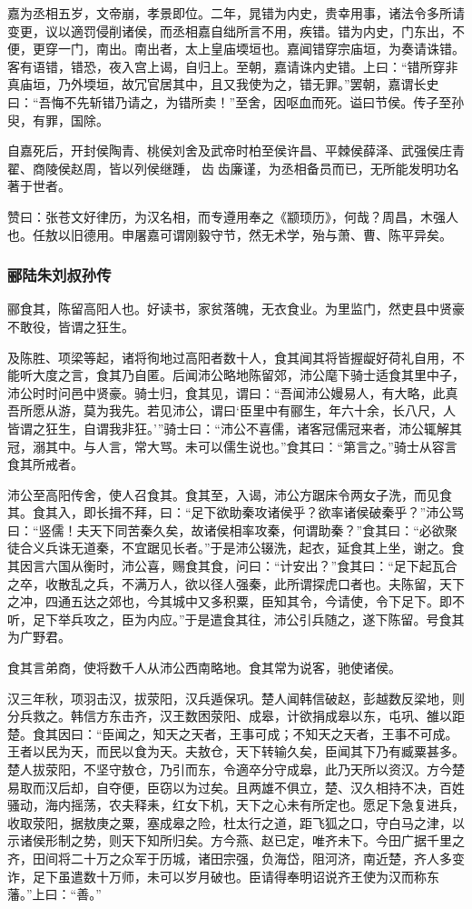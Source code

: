 \documentclass[]{article}
\begin{document}
嘉为丞相五岁，文帝崩，孝景即位。二年，晁错为内史，贵幸用事，诸法令多所请变更，议以適罚侵削诸侯，而丞相嘉自绌所言不用，疾错。错为内史，门东出，不便，更穿一门，南出。南出者，太上皇庙堧垣也。嘉闻错穿宗庙垣，为奏请诛错。客有语错，错恐，夜入宫上谒，自归上。至朝，嘉请诛内史错。上曰：``错所穿非真庙垣，乃外堧垣，故冗官居其中，且又我使为之，错无罪。''罢朝，嘉谓长史曰：``吾悔不先斩错乃请之，为错所卖！''至舍，因呕血而死。谥曰节侯。传子至孙臾，有罪，国除。

自嘉死后，开封侯陶青、桃侯刘舍及武帝时柏至侯许昌、平棘侯薛泽、武强侯庄青翟、商陵侯赵周，皆以列侯继踵，齿齿廉谨，为丞相备员而已，无所能发明功名著于世者。

赞曰：张苍文好律历，为汉名相，而专遵用奉之《颛顼历》，何哉？周昌，木强人也。任敖以旧德用。申屠嘉可谓刚毅守节，然无术学，殆与萧、曹、陈平异矣。

\hypertarget{header-n3917}{%
\subsubsection{郦陆朱刘叔孙传}\label{header-n3917}}

郦食其，陈留高阳人也。好读书，家贫落魄，无衣食业。为里监门，然吏县中贤豪不敢役，皆谓之狂生。

及陈胜、项梁等起，诸将徇地过高阳者数十人，食其闻其将皆握龊好荷礼自用，不能听大度之言，食其乃自匿。后闻沛公略地陈留郊，沛公麾下骑士适食其里中子，沛公时时问邑中贤豪。骑士归，食其见，谓曰：``吾闻沛公嫚易人，有大略，此真吾所愿从游，莫为我先。若见沛公，谓曰`臣里中有郦生，年六十余，长八尺，人皆谓之狂生，自谓我非狂。'''骑士曰：``沛公不喜儒，诸客冠儒冠来者，沛公辄解其冠，溺其中。与人言，常大骂。未可以儒生说也。''食其曰：``第言之。''骑士从容言食其所戒者。

沛公至高阳传舍，使人召食其。食其至，入谒，沛公方踞床令两女子洗，而见食其。食其入，即长揖不拜，曰：``足下欲助秦攻诸侯乎？欲率诸侯破秦乎？''沛公骂曰：``竖儒！夫天下同苦秦久矣，故诸侯相率攻秦，何谓助秦？''食其曰：``必欲聚徒合义兵诛无道秦，不宜踞见长者。''于是沛公辍洗，起衣，延食其上坐，谢之。食其因言六国从衡时，沛公喜，赐食其食，问曰：``计安出？''食其曰：``足下起瓦合之卒，收散乱之兵，不满万人，欲以径人强秦，此所谓探虎口者也。夫陈留，天下之冲，四通五达之郊也，今其城中又多积粟，臣知其令，今请使，令下足下。即不听，足下举兵攻之，臣为内应。''于是遣食其往，沛公引兵随之，遂下陈留。号食其为广野君。

食其言弟商，使将数千人从沛公西南略地。食其常为说客，驰使诸侯。

汉三年秋，项羽击汉，拔荥阳，汉兵遁保巩。楚人闻韩信破赵，彭越数反梁地，则分兵救之。韩信方东击齐，汉王数困荥阳、成皋，计欲捐成皋以东，屯巩、雒以距楚。食其因曰：``臣闻之，知天之天者，王事可成；不知天之天者，王事不可成。王者以民为天，而民以食为天。夫敖仓，天下转输久矣，臣闻其下乃有臧粟甚多。楚人拔荥阳，不坚守敖仓，乃引而东，令適卒分守成皋，此乃天所以资汉。方今楚易取而汉后却，自夺便，臣窃以为过矣。且两雄不俱立，楚、汉久相持不决，百姓骚动，海内摇荡，农夫释耒，红女下机，天下之心未有所定也。愿足下急复进兵，收取荥阳，据敖庚之粟，塞成皋之险，杜太行之道，距飞狐之口，守白马之津，以示诸侯形制之势，则天下知所归矣。方今燕、赵已定，唯齐未下。今田广据千里之齐，田间将二十万之众军于历城，诸田宗强，负海岱，阻河济，南近楚，齐人多变诈，足下虽遣数十万师，未可以岁月破也。臣请得奉明诏说齐王使为汉而称东藩。''上曰：``善。''
\end{document}
